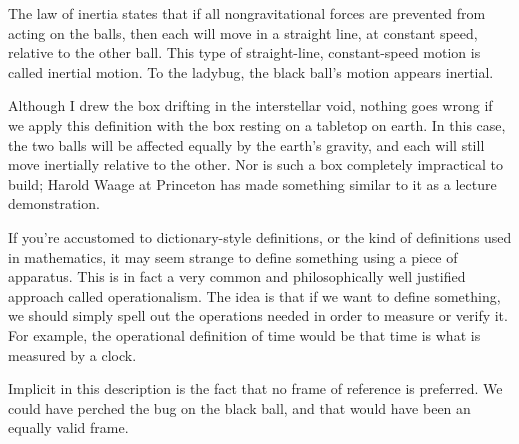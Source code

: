 The law of inertia states that if all nongravitational forces are prevented from acting on the balls,
then each will move in a straight line, at constant speed, relative to the other ball. This type of
straight-line, constant-speed motion is called inertial motion. To the ladybug,
the black ball's motion appears inertial.

Although I drew the box drifting in the interstellar void, nothing goes wrong if we apply this definition
with the box resting on a tabletop on earth. In this case, the two balls will be affected equally by the earth's
gravity, and each will still move inertially relative to the other.
Nor is such a box completely impractical to build;
Harold Waage at Princeton has made something similar to it as a lecture demonstration.

If you're accustomed to dictionary-style definitions, or the kind of definitions used in mathematics,
it may seem strange to define something using a piece of apparatus.
This is in fact a very common and philosophically well justified approach called operationalism.
The idea is that if we want to define something,
we should simply spell out the operations needed in order to measure or verify it.
For example, the operational definition of time would be that time is what is measured by a clock.

Implicit in this description is the fact that no frame of reference is preferred. We could have perched the
bug on the black ball, and that would have been an equally valid frame.
